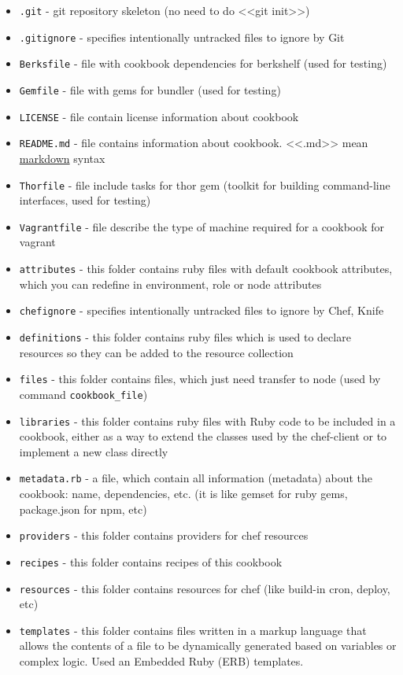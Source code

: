 \begin{itemize}
  \item \lstinline!.git! - git repository skeleton (no need to do <<git init>>)
  \item \lstinline!.gitignore! - specifies intentionally untracked files to ignore by Git
  \item \lstinline!Berksfile! - file with cookbook dependencies for berkshelf (used for testing)
  \item \lstinline!Gemfile! - file with gems for bundler (used for testing)
  \item \lstinline!LICENSE! - file contain license information about cookbook
  \item \lstinline!README.md! - file contains information about cookbook. <<.md>> mean \href{http://daringfireball.net/projects/markdown/syntax}{markdown} syntax
  \item \lstinline!Thorfile! - file include tasks for thor gem (toolkit for building command-line interfaces, used for testing)
  \item \lstinline!Vagrantfile! - file describe the type of machine required for a cookbook for vagrant
  \item \lstinline!attributes! - this folder contains ruby files with default cookbook attributes, which you can redefine in environment, role or node attributes
  \item \lstinline!chefignore! - specifies intentionally untracked files to ignore by Chef, Knife
  \item \lstinline!definitions! - this folder contains ruby files which is used to declare resources so they can be added to the resource collection
  \item \lstinline!files! - this folder contains files, which just need transfer to node (used by command \lstinline!cookbook_file!)
  \item \lstinline!libraries! - this folder contains ruby files with Ruby code to be included in a cookbook, either as a way to extend the classes used by the chef-client or to implement a new class directly
  \item \lstinline!metadata.rb! - a file, which contain all information (metadata) about the cookbook: name, dependencies, etc. (it is like gemset for ruby gems, package.json for npm, etc)
  \item \lstinline!providers! - this folder contains providers for chef resources
  \item \lstinline!recipes! - this folder contains recipes of this cookbook
  \item \lstinline!resources! - this folder contains resources for chef (like build-in cron, deploy, etc)
  \item \lstinline!templates! - this folder contains files written in a markup language that allows the contents of a file to be dynamically generated based on variables or complex logic. Used an Embedded Ruby (ERB) templates.
\end{itemize}
